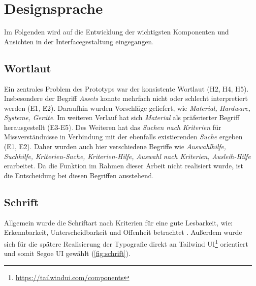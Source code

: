 \section{Designsprache}

Im Folgenden wird auf die Entwicklung der wichtigsten Komponenten und Ansichten
in der Interfacegestaltung eingegangen.

\subsection{Wortlaut}
Ein zentrales Problem des Prototyps war der konsistente Wortlaut (H2, H4, H5).
Insbesondere der Begriff \textit{Assets} konnte mehrfach nicht oder schlecht
interpretiert werden (E1, E2). Daraufhin wurden Vorschläge geliefert, wie
\textit{Material, Hardware, Systeme, Geräte}. Im weiteren Verlauf hat sich
\textit{Material} als präferierter Begriff herausgestellt (E3-E5). Des Weiteren
hat das \textit{Suchen nach Kriterien} für Missverständnisse in Verbindung mit
der ebenfalls existierenden \textit{Suche} ergeben (E1, E2). Daher wurden auch
hier verschiedene Begriffe wie
\textit{Auswahlhilfe, Suchhilfe, Kriterien-Suche, Kriterien-Hilfe, Auswahl nach Kriterien, Ausleih-Hilfe}
erarbeitet. Da die Funktion im Rahmen dieser Arbeit nicht realisiert wurde, ist
die Entscheidung bei diesen Begriffen ausstehend.

\subsection{Schrift}
Allgemein wurde die Schriftart nach Kriterien für eine gute Lesbarkeit, wie:
Erkennbarkeit, Unterscheidbarkeit und Offenheit betrachtet
\cite{kommunikationsdesign_leserlichinfo}. Außerdem wurde sich für die spätere
Realisierung der Typografie direkt an Tailwind
UI\footnote{\url{https://tailwindui.com/components}} orientiert und somit Segoe
UI gewählt (\ref{fig:schrift}).

